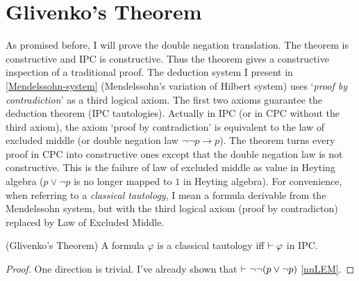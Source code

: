 \section{Glivenko's Theorem}
As promised before, I will prove the double negation translation.
The theorem is constructive and IPC is constructive. Thus the
theorem gives a constructive inspection of a traditional proof.
The deduction system I present in \autoref{Mendelssohn-system} 
(Mendelssohn's variation of Hilbert system) uses
`{\it proof by contradiction}' as a third logical axiom. The first
two axioms guarantee the deduction theorem (IPC tautologies).
Actually in IPC (or in CPC without the third axiom), 
the axiom `proof by contradiction' is equivalent to the law of
excluded middle (or double negation law $\neg\neg p\to p$). The
theorem turns every proof in CPC into constructive ones except
that the double negation law is not constructive. This is the failure
of law of excluded middle as value in Heyting algebra ($p\vee\neg p$
is no longer mapped to $1$ in Heyting algebra). For convenience,
when referring to a {\it classical tautology}, I mean a formula
derivable from the Mendelssohn system, but with the third logical
axiom (proof by contradicton) replaced by Law of Excluded Middle. 

\begin{theorem}
    \label{glivenko-theorem}
    (Glivenko's Theorem) A formula $\varphi$ is a classical tautology
    iff $\vdash\varphi$ in IPC. 
\end{theorem}
\begin{proof}
    One direction is trivial. 
    I've already shown that $\vdash \neg\neg(p\vee\neg p)$ 
    \eqref{nnLEM}.
\end{proof}

